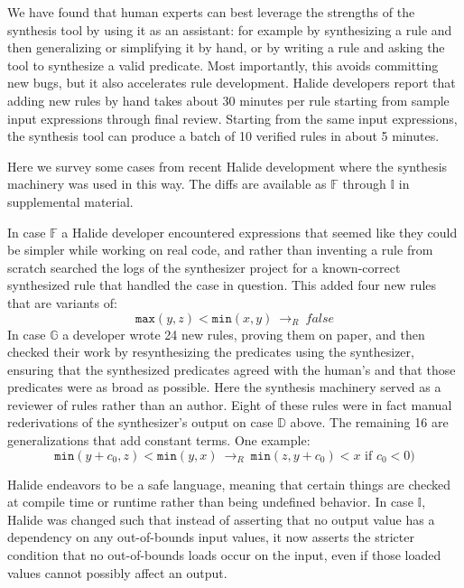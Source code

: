 \documentclass[acmsmall,review,anonymous]{acmart}\settopmatter{printfolios=true,printccs=false,printacmref=false}
\newcommand{\hmax}[0]{\texttt{max}}
\newcommand{\hmin}[0]{\texttt{min}}
\newcommand{\rewrites}[0]{\:\rightarrow_{R}\:}
\newcommand{\pred}[0]{\textrm{ if }}
\begin{document}

We have found that human experts can best leverage the strengths of the synthesis tool by using it as an assistant: for example by synthesizing a rule and then generalizing or simplifying it by hand, or by writing a rule and asking the tool to synthesize a valid predicate. Most importantly, this avoids committing new bugs, but it also accelerates rule development. Halide developers report that adding new rules by hand takes about 30 minutes per rule starting from sample input expressions through final review. Starting from the same input expressions, the synthesis tool can produce a batch of 10 verified rules in about 5 minutes.

Here we survey some cases from recent Halide development where the synthesis machinery was used in this way. The diffs are available as $\mathbb{F}$ through $\mathbb{I}$ in supplemental material. 

In case $\mathbb{F}$ a Halide developer encountered expressions that seemed like they could be simpler while working on real code, and rather than inventing a rule from scratch searched the logs of the synthesizer project for a known-correct synthesized rule that handled the case in question. This added four new rules that are variants of:
\[
\hmax(y, z) < \hmin(x, y) \rewrites \mathit{false}
\]
In case $\mathbb{G}$ a developer wrote 24 new rules, proving them on paper, and then checked their work by resynthesizing the predicates using the synthesizer, ensuring that the synthesized predicates agreed with the human’s and that those predicates were as broad as possible. Here the synthesis machinery served as a reviewer of rules rather than an author. Eight of these rules were in fact manual rederivations of the synthesizer’s output on case $\mathbb{D}$ above. The remaining 16 are generalizations that add constant terms. One example:
\[
\hmin(y + c_0, z) < \hmin(y, x) \rewrites \hmin(z, y + c_0) < x \pred c_0 < 0)
\]

Halide endeavors to be a safe language, meaning that certain things are checked at compile time or runtime rather than being undefined behavior. In case $\mathbb{I}$, Halide was changed such that instead of asserting that no output value has a dependency on any out-of-bounds input values, it now asserts the stricter condition that no out-of-bounds loads occur on the input, even if those loaded values cannot possibly affect an output.
\end{document}
